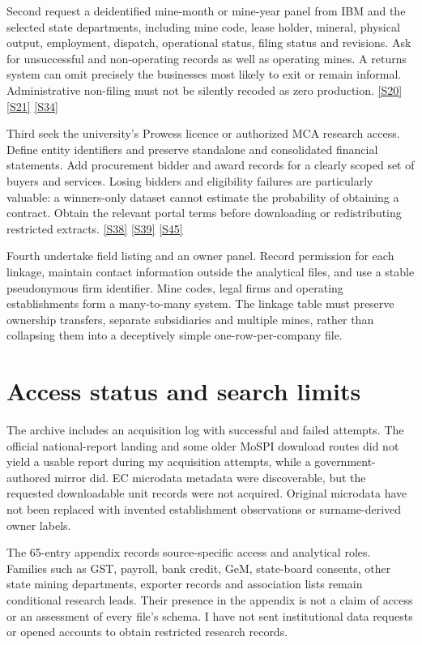 \documentclass[11pt,a4paper]{report}
\begin{document}
Second request a deidentified mine-month or mine-year panel from IBM and the selected state departments, including mine code, lease holder, mineral, physical output, employment, dispatch, operational status, filing status and revisions. Ask for unsuccessful and non-operating records as well as operating mines. A returns system can omit precisely the businesses most likely to exit or remain informal. Administrative non-filing must not be silently recoded as zero production. \hyperlink{S20}{[S20]} \hyperlink{S21}{[S21]} \hyperlink{S34}{[S34]}

Third seek the university's Prowess licence or authorized MCA research access. Define entity identifiers and preserve standalone and consolidated financial statements. Add procurement bidder and award records for a clearly scoped set of buyers and services. Losing bidders and eligibility failures are particularly valuable: a winners-only dataset cannot estimate the probability of obtaining a contract. Obtain the relevant portal terms before downloading or redistributing restricted extracts. \hyperlink{S38}{[S38]} \hyperlink{S39}{[S39]} \hyperlink{S45}{[S45]}

Fourth undertake field listing and an owner panel. Record permission for each linkage, maintain contact information outside the analytical files, and use a stable pseudonymous firm identifier. Mine codes, legal firms and operating establishments form a many-to-many system. The linkage table must preserve ownership transfers, separate subsidiaries and multiple mines, rather than collapsing them into a deceptively simple one-row-per-company file.

\section{Access status and search limits}
The archive includes an acquisition log with successful and failed attempts. The official national-report landing and some older MoSPI download routes did not yield a usable report during my acquisition attempts, while a government-authored mirror did. EC microdata metadata were discoverable, but the requested downloadable unit records were not acquired. Original microdata have not been replaced with invented establishment observations or surname-derived owner labels.

The 65-entry appendix records source-specific access and analytical roles. Families such as GST, payroll, bank credit, GeM, state-board consents, other state mining departments, exporter records and association lists remain conditional research leads. Their presence in the appendix is not a claim of access or an assessment of every file's schema. I have not sent institutional data requests or opened accounts to obtain restricted research records.
\end{document}
